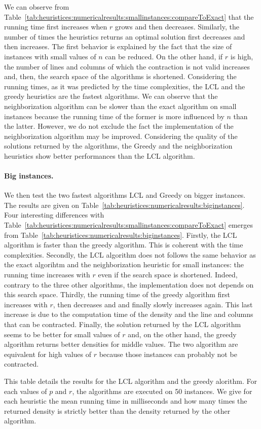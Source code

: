 We can observe from Table~\ref{tab:heuristices:numericalresults:smallinstances:compareToExact} that the running time first increases when $r$ grows and then decreases. Similarly, the number of times the heuristics returns an optimal solution first decreases and then increases. The first behavior is explained by the fact that the size of instances with small values of $n$ can be reduced. On the other hand, if $r$ is high, the number of lines and columns of which the contraction is not valid increases and, then, the search space of the algorithms is shortened. Considering the running times, as it was predicted by the time complexities, the LCL and the greedy heuristics are the fastest algorithms. We can observe that the neighborization algorithm can be slower than the exact algorithm on small instances because the running time of the former is more influenced by $n$ than the latter. However, we do not exclude the fact the implementation of the neighborization algorithm may be improved. Considering the quality of the solutions returned by the algorithms, the Greedy and the neighborization heuristics show better performances than the LCL algorithm.

\paragraph{Big instances. }
We then test the two fastest algorithms LCL and Greedy on bigger instances. The results are given on Table~\ref{tab:heuristices:numericalresults:biginstances}.  Four interesting differences with Table~\ref{tab:heuristices:numericalresults:smallinstances:compareToExact} emerges from Table~\ref{tab:heuristices:numericalresults:biginstances}. Firstly, the LCL algorithm is faster than the greedy algorithm. This is coherent with the time complexities. Secondly, the LCL algorithm does not follows the same behavior as the exact algorihtm and the neighborization heuristic for small instances: the running time increases with $r$ even if the search space is shortened. Indeed, contrary to the three other algorithms, the implementation does not depends on this search space. Thirdly, the running time of the greedy algorithm first increases with $r$, then decreases and and finally slowly increases again. This last increase is due to the computation time of the density and the line and columns that can be contracted.  Finally, the solution returned by the LCL algorithm seems to be better for small values of $r$ and, on the other hand, the greedy algorithm returns better densities for middle values. The two algorithm are equivalent for high values of $r$ because those instances can probably not be contracted.

\begin{table}[ht!]
	\centering
	\def\arraystretch{1.2}
	\setlength\tabcolsep{0.05cm}
	\scriptsize
	\caption{This table details the results for the LCL algorithm and the greedy alorithm. For each values of $p$ and $r$, the algorithms are executed on 50 instances. We give for each heuristic the mean running time in milliseconds and how many times the returned density is strictly better than the density returned by the other algorithm.}
	
	\label{tab:heuristices:numericalresults:biginstances}
\end{table}
